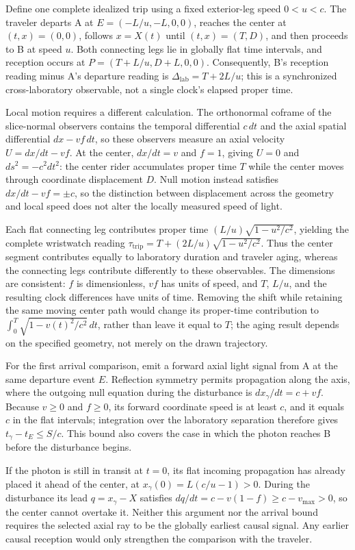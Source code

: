 \documentclass[11pt]{article}
\begin{document}
Define one complete idealized trip using a fixed exterior-leg speed $0<u<c$. The traveler departs A at $E=(-L/u,-L,0,0)$, reaches the center at $(t,x)=(0,0)$, follows $x=X(t)$ until $(t,x)=(T,D)$, and then proceeds to B at speed $u$. Both connecting legs lie in globally flat time intervals, and reception occurs at $P=(T+L/u,D+L,0,0)$. Consequently, B's reception reading minus A's departure reading is $\Delta_{\mathrm{lab}}=T+2L/u$; this is a synchronized cross-laboratory observable, not a single clock's elapsed proper time.

Local motion requires a different calculation. The orthonormal coframe of the slice-normal observers contains the temporal differential $c\,dt$ and the axial spatial differential $dx-vf\,dt$, so these observers measure an axial velocity $U=dx/dt-vf$. At the center, $dx/dt=v$ and $f=1$, giving $U=0$ and $ds^2=-c^2dt^2$: the center rider accumulates proper time $T$ while the center moves through coordinate displacement $D$. Null motion instead satisfies $dx/dt-vf=\pm c$, so the distinction between displacement across the geometry and local speed does not alter the locally measured speed of light.

Each flat connecting leg contributes proper time $(L/u)\sqrt{1-u^2/c^2}$, yielding the complete wristwatch reading $\tau_{\mathrm{trip}}=T+(2L/u)\sqrt{1-u^2/c^2}$. Thus the center segment contributes equally to laboratory duration and traveler aging, whereas the connecting legs contribute differently to these observables. The dimensions are consistent: $f$ is dimensionless, $vf$ has units of speed, and $T$, $L/u$, and the resulting clock differences have units of time. Removing the shift while retaining the same moving center path would change its proper-time contribution to $\int_0^T\sqrt{1-v(t)^2/c^2}\,dt$, rather than leave it equal to $T$; the aging result depends on the specified geometry, not merely on the drawn trajectory.

For the first arrival comparison, emit a forward axial light signal from A at the same departure event $E$. Reflection symmetry permits propagation along the axis, where the outgoing null equation during the disturbance is $dx_\gamma/dt=c+vf$. Because $v\geq0$ and $f\geq0$, its forward coordinate speed is at least $c$, and it equals $c$ in the flat intervals; integration over the laboratory separation therefore gives $t_\gamma-t_E\leq S/c$. This bound also covers the case in which the photon reaches B before the disturbance begins.

If the photon is still in transit at $t=0$, its flat incoming propagation has already placed it ahead of the center, at $x_\gamma(0)=L(c/u-1)>0$. During the disturbance its lead $q=x_\gamma-X$ satisfies $dq/dt=c-v(1-f)\geq c-v_{\max}>0$, so the center cannot overtake it. Neither this argument nor the arrival bound requires the selected axial ray to be the globally earliest causal signal. Any earlier causal reception would only strengthen the comparison with the traveler.
\end{document}

